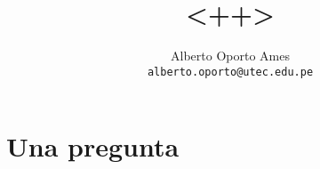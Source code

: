 \documentclass[12pt]{article}
\title{<++>}
\author{Alberto Oporto Ames\\
		\texttt{alberto.oporto@utec.edu.pe}}
\begin{document}
\maketitle

\section{Una pregunta}%
\label{sec:una_pregunta}
\end{document}
